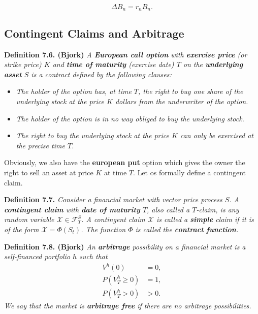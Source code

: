 \documentclass[a4paper,10pt,openany]{book}
\providecommand{\tightlist}{%
 \setlength{\itemsep}{0pt}\setlength{\parskip}{0pt}}
\begin{document}
\[
\Delta B_n=r_n B_n.\tag{7.7}
\]

\hypertarget{contingent-claims-and-arbitrage}{%
\subsection{Contingent Claims and Arbitrage}\label{contingent-claims-and-arbitrage}}

\textbf{Definition 7.6. (Bjork)} \emph{A \textbf{European call option} with \textbf{exercise price} (or strike price) \(K\) and \textbf{time of maturity} (exercise date) \(T\) on the \textbf{underlying asset} \(S\) is a contract defined by the following clauses:}

\begin{itemize}
\tightlist
\item
  \emph{The holder of the option has, at time \(T\), the right to buy one share of the underlying stock at the price \(K\) dollars from the underwriter of the option.}
\item
  \emph{The holder of the option is in no way obliged to buy the underlying stock.}
\item
  \emph{The right to buy the underlying stock at the price \(K\) can only be exercised at the precise time \(T\).}
\end{itemize}

Obviously, we also have the \textbf{european put} option which gives the owner the right to sell an asset at price \(K\) at time \(T\). Let os formally define a contingent claim.

\textbf{Definition 7.7.} \emph{Consider a financial market with vector price process \(S\). A \textbf{contingent claim} with \textbf{date of maturity} \(T\), also called a \(T\)-claim, is any random variable \(\mathcal{X}\in\mathcal{F}_T^S\). A contingent claim \(\mathcal{X}\) is called a \textbf{simple} claim if it is of the form \(\mathcal{X} = \Phi(S_t)\). The function \(\Phi\) is called the \textbf{contract function}.}

\textbf{Definition 7.8. (Bjork)} \emph{An \textbf{arbitrage} possibility on a financial market is a self-financed portfolio \(h\) such that}
\begin{align*}
V^h(0)&=0,\tag{7.13}\\
P(V_T^h\ge0)&=1,\tag{7-14}\\
P(V_T^h>0)&>0.\tag{7.15}
\end{align*}
\emph{We say that the market is \textbf{arbitrage free} if there are no arbitrage possibilities.}
\end{document}
